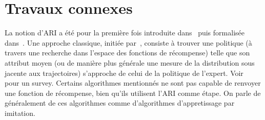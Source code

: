 \documentclass[english,utf8]{./hermes-journal}
\begin{document}

\section{Travaux connexes}
\label{sec:relatedWorks}

La notion d'ARI a été pour la première fois introduite dans~\cite{Russell:1998}
puis formalisée dans~\cite{Ng:2000}. Une approche classique, initiée par~\cite{Abbeel:2004}, consiste à trouver une politique (à travers une recherche dans l'espace des fonctions de récompense) telle que son attribut moyen (ou de manière plus générale une mesure de la distribution sous jacente aux trajectoires) s'approche de celui de la politique de l'expert.
%
Voir~\cite{Neu:2010} pour un survey.
%
%
Certains algorithmes mentionnés ne sont pas capable de renvoyer une fonction de récompense, bien qu'ils utilisent l'ARI comme étape. On parle de généralement de ces algorithmes comme d'algorithmes d'appretissage par imitation.
%
\end{document}
